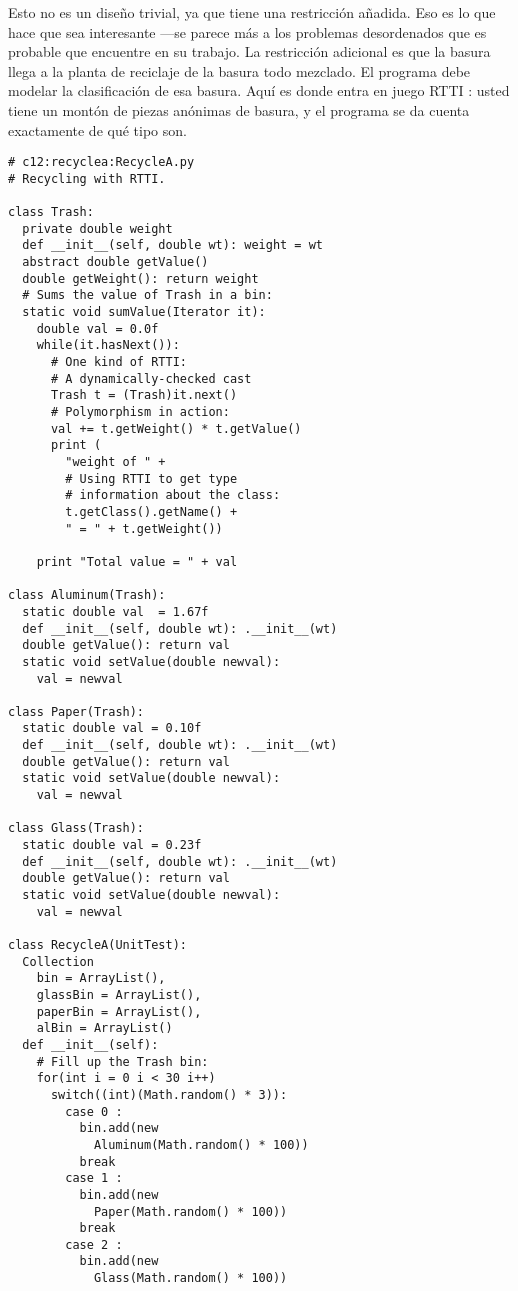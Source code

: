 Esto no es un diseño trivial, ya que tiene una restricción añadida. Eso es lo que hace que sea interesante —se parece más a los problemas desordenados que es probable que encuentre en su trabajo. La restricción adicional es que la basura llega a la planta de reciclaje de la basura todo mezclado. El programa debe modelar la clasificación de esa basura. Aquí es donde entra en juego RTTI : usted tiene un montón de piezas anónimas de basura, y el programa se da cuenta exactamente de qué tipo son.  \newline

\begin{lstlisting} 
# c12:recyclea:RecycleA.py  
# Recycling with RTTI. 

class Trash: 
  private double weight 
  def __init__(self, double wt): weight = wt  
  abstract double getValue() 
  double getWeight(): return weight  
  # Sums the value of Trash in a bin: 
  static void sumValue(Iterator it): 
    double val = 0.0f 
    while(it.hasNext()): 
      # One kind of RTTI: 
      # A dynamically-checked cast 
      Trash t = (Trash)it.next() 
      # Polymorphism in action: 
      val += t.getWeight() * t.getValue() 
      print ( 
        "weight of " + 
        # Using RTTI to get type 
        # information about the class: 
        t.getClass().getName() + 
        " = " + t.getWeight()) 
        
    print "Total value = " + val 
    
class Aluminum(Trash): 
  static double val  = 1.67f 
  def __init__(self, double wt): .__init__(wt)  
  double getValue(): return val  
  static void setValue(double newval): 
    val = newval 
    
class Paper(Trash): 
  static double val = 0.10f 
  def __init__(self, double wt): .__init__(wt)  
  double getValue(): return val  
  static void setValue(double newval): 
    val = newval 
    
class Glass(Trash): 
  static double val = 0.23f 
  def __init__(self, double wt): .__init__(wt)  
  double getValue(): return val  
  static void setValue(double newval): 
    val = newval 
    
class RecycleA(UnitTest): 
  Collection  
    bin = ArrayList(), 
    glassBin = ArrayList(), 
    paperBin = ArrayList(), 
    alBin = ArrayList() 
  def __init__(self): 
    # Fill up the Trash bin: 
    for(int i = 0 i < 30 i++) 
      switch((int)(Math.random() * 3)): 
        case 0 : 
          bin.add(new 
            Aluminum(Math.random() * 100)) 
          break 
        case 1 : 
          bin.add(new 
            Paper(Math.random() * 100)) 
          break 
        case 2 : 
          bin.add(new 
            Glass(Math.random() * 100)) 
            

\end{lstlisting}
